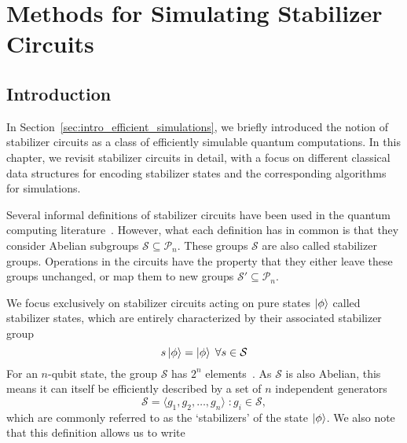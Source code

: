 
\chapter[Methods for Simulating Stabilizer Circuits]{Methods for Simulating Stabilizer\\ Circuits}
\label{chap:stabilizers}

\section{Introduction}\label{sec:stabilizer-intro}
In Section~\ref{sec:intro_efficient_simulations}, we briefly introduced the notion of stabilizer circuits as a class of efficiently simulable quantum computations. In this chapter, we revisit stabilizer circuits in detail, with a focus on different classical data structures for encoding stabilizer states and the corresponding algorithms for simulations.\par
Several informal definitions of stabilizer circuits have been used in the quantum computing literature~\cite{VandenNest2008,Gottesman1998b,Aaronson2004,Seddon2019}. However, what each definition has in common is that they consider Abelian subgroups $\mathcal{S} \subseteq \mathcal{P}_{n}$. These groups $\mathcal{S}$ are also called stabilizer groups. Operations in the circuits have the property that they either leave these groups unchanged, or map them to new groups $\mathcal{S'}\subseteq \mathcal{P}_{n}$.\par
We focus exclusively on stabilizer circuits acting on pure states $\ket{\phi}$ called stabilizer states, which are entirely characterized by their associated stabilizer group
\begin{equation}
    s\ket{\phi}=\ket{\phi}\;\forall s\in\mathcal{S}
\end{equation}
For an $n$-qubit state, the group $\mathcal{S}$ has $2^{n}$ elements~\cite{Gottesman1998b}. As $\mathcal{S}$ is also Abelian, this means it can itself be efficiently described by a set of $n$ independent generators  
\begin{equation}
    \mathcal{S} = \langle g_{1}, g_{2},\dots,g_{n}\rangle \; : g_{i}\in\mathcal{S},
\end{equation}
which are commonly referred to as the `stabilizers' of the state $\ket{\phi}$. We also note that this definition allows us to write
